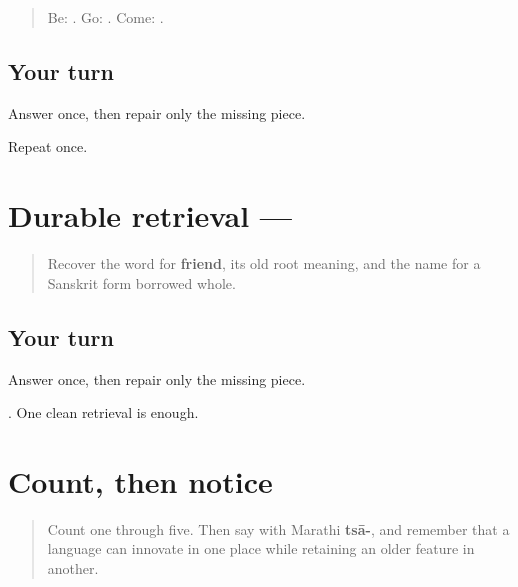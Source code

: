 \label{lesson:MR-R14-core}



\begin{quote}
Be: \textbf{}. Go: \textbf{}. Come: \textbf{}.
\end{quote}

\subsection*{Your turn}
Answer once, then repair only the missing piece.

\begin{tcolorbox}[breakable,colback=teal!4,colframe=teal!35!black,title={Before you move on}]
Repeat once.
\end{tcolorbox}
\section[mitra]{Durable retrieval — }

\label{lesson:MR-R14-mitra-r3}



\begin{quote}
Recover the word for \textbf{friend}, its old root meaning, and the name for a Sanskrit form borrowed whole.
\end{quote}

\subsection*{Your turn}
Answer once, then repair only the missing piece.

\begin{tcolorbox}[breakable,colback=teal!4,colframe=teal!35!black,title={Before you move on}]
\textbf{}. One clean retrieval is enough.
\end{tcolorbox}
\section[ek te paach]{Count, then notice}

\label{lesson:MR-R14-numbers}



\begin{quote}
Count one through five. Then say \textbf{} with Marathi \textbf{tsā-}, and remember that a language can innovate in one place while retaining an older feature in another.
\end{quote}

